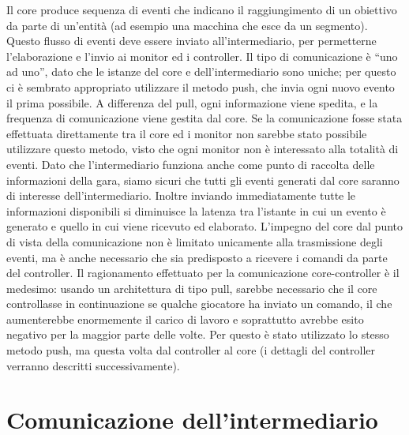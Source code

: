 Il core produce sequenza di eventi che indicano il raggiungimento di un obiettivo da parte di un’entità (ad esempio una macchina che esce da un segmento).
Questo flusso di eventi deve essere inviato all’intermediario, per permetterne l’elaborazione e l’invio ai monitor ed i controller.
Il tipo di comunicazione è “uno ad uno”, dato che le istanze del core e dell’intermediario sono uniche; per questo ci è sembrato appropriato utilizzare il metodo push, che invia ogni nuovo evento il prima possibile.
A differenza del pull, ogni informazione viene spedita, e la frequenza di comunicazione viene gestita dal core. Se la comunicazione fosse stata effettuata direttamente tra il core ed i monitor non sarebbe stato possibile utilizzare questo metodo, visto che ogni monitor non è interessato alla totalità di eventi. Dato che l’intermediario funziona anche come punto di raccolta delle informazioni della gara, siamo sicuri che tutti gli eventi generati dal core saranno di interesse dell’intermediario. Inoltre inviando immediatamente tutte le informazioni disponibili si diminuisce la latenza tra l’istante in cui un evento è generato e quello in cui viene ricevuto ed elaborato.
L’impegno del core dal punto di vista della comunicazione non è limitato unicamente alla trasmissione degli eventi, ma è anche necessario che sia predisposto a ricevere i comandi da parte del controller. Il ragionamento effettuato per la comunicazione core-controller è il medesimo: usando un architettura di tipo pull, sarebbe necessario che il core controllasse in continuazione se qualche giocatore ha inviato un comando, il che aumenterebbe enormemente il carico di lavoro e soprattutto avrebbe esito negativo per la maggior parte delle volte. Per questo è stato utilizzato lo stesso metodo push, ma questa volta dal controller al core (i dettagli del controller verranno descritti successivamente).


\section{Comunicazione dell’intermediario}


